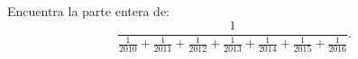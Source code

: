Encuentra la parte entera de:
\[\frac{1}{\frac{1}{2010}+\frac{1}{2011}+\frac{1}{2012}+\frac{1}{2013}+\frac{1}{2014}+\frac{1}{2015}+\frac{1}{2016}}.\]